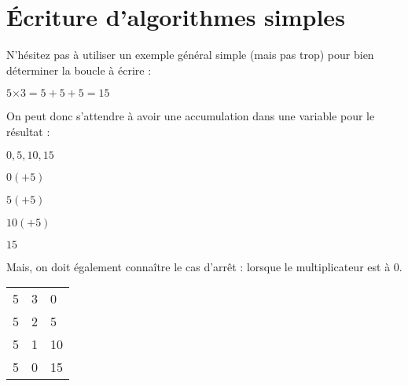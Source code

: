 \documentclass[11pt,a4paper]{article}
\begin{document}
\vfillLast

\newpage


\section{\'Ecriture d'algorithmes simples}

\bigskip


\bigskip

N'hésitez pas à utiliser un exemple général simple (mais pas trop) pour bien déterminer la boucle à écrire :
\begin{center}

$ 5 \text{×} 3 = 5 + 5 + 5 = 15 $

\end{center}

On peut donc s'attendre à avoir une accumulation dans une variable pour le résultat :
\begin{center}

$ 0, 5, 10, 15 $

\medskip

$ 0 (+ 5) $

$ 5 (+ 5) $

$ 10 (+ 5) $

$ 15 $
\end{center}


Mais, on doit également connaître le cas d'arrêt : lorsque le multiplicateur est à $ 0 $.


\begin{center}
\begin{tabular}{|C{1cm}|C{1cm}|C{1cm}|}
  & 3 &  0 \\
  5 & 2 &  5 \\
  5 & 1 & 10 \\
  5 & 0 & 15 \\
 \hline
\end{tabular}
\end{center}


\bigskip
\end{document}
